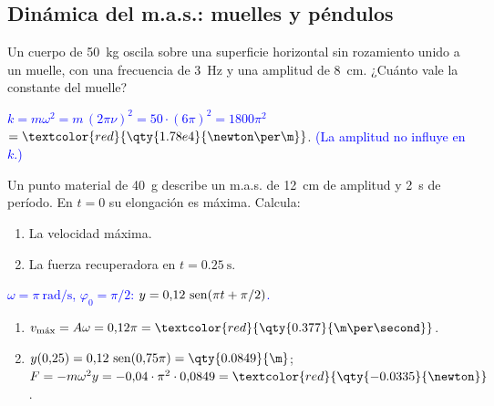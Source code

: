 \subsection{Dinámica del m.a.s.: muelles y péndulos}

\begin{exercise}
    Un cuerpo de \qty{50}{\kg} oscila sobre una superficie horizontal sin rozamiento unido a un muelle, con una frecuencia de
    \qty{3}{\hertz} y una amplitud de \qty{8}{\cm}. ¿Cuánto vale la constante del muelle?
    \begin{solu}
        \textcolor{blue}{\(k = m\omega^2 = m\,(2\pi\nu)^2 = 50\cdot(6\pi)^2 = 1800\pi^2\)} \(= \textcolor{red}{\qty{1.78e4}{\newton\per\m}}\).
        \textcolor{blue}{(La amplitud no influye en \(k\).)}
    \end{solu}
\end{exercise}

\begin{exercise}
    Un punto material de \qty{40}{\g} describe un m.a.s. de \qty{12}{\cm} de amplitud y \qty{2}{\second} de período. En
    \(t = 0\) su elongación es máxima. Calcula:
    \begin{enumerate}[label=\letraminuscula]
        \item La velocidad máxima.
        \item La fuerza recuperadora en \(t = \qty{0.25}{\second}\).
    \end{enumerate}
    \begin{solu}
        \textcolor{blue}{\(\omega = \pi\ \unit{\radian\per\second}\), \(\varphi_0 = \pi/2\): \(y = 0{,}12\,\operatorname{sen}(\pi t + \pi/2)\).}
        \begin{enumerate}[label=\letraminuscula]
            \item \(v_{\text{máx}} = A\omega = 0{,}12\pi = \textcolor{red}{\qty{0.377}{\m\per\second}}\).
            \item \(y(0{,}25) = 0{,}12\,\sen(0{,}75\pi) = \qty{0.0849}{\m}\);
            \(F = -m\omega^2 y = -0{,}04\cdot\pi^2\cdot 0{,}0849 = \textcolor{red}{\qty{-0.0335}{\newton}}\).
        \end{enumerate}
    \end{solu}
\end{exercise}

